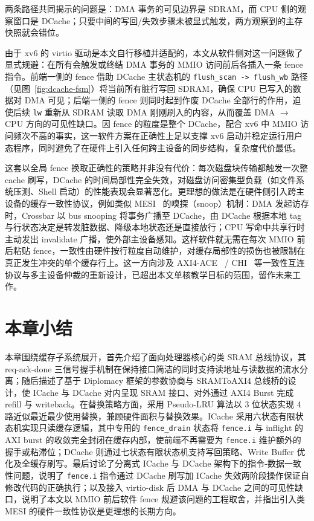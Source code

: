 两条路径共同揭示的问题是：DMA 事务的可见边界是 SDRAM，而 CPU 侧的观察窗口是 DCache；只要中间的写回/失效步骤未被显式触发，两方观察到的主存快照就会错位。

由于 xv6 的 virtio 驱动是本文自行移植并适配的，本文从软件侧对这一问题做了显式规避：在所有会触发或终结 DMA 事务的 MMIO 访问前后各插入一条 fence 指令。前端一侧的 fence 借助 DCache 主状态机的 \lstinline|flush_scan -> flush_wb| 路径（见图~\ref{fig:dcache-fsm}）将当前所有脏行写回 SDRAM，确保 CPU 已写入的数据对 DMA 可见；后端一侧的 fence 则同时起到作废 DCache 全部行的作用，迫使后续 \lstinline|lw| 重新从 SDRAM 读取 DMA 刚刚刷入的内容，从而覆盖 DMA $\to$ CPU 方向的可见性缺口。因 fence 的粒度是整个 DCache，配合 xv6 中 MMIO 访问频次不高的事实，这一软件方案在正确性上足以支撑 xv6 启动并稳定运行用户态程序，同时避免了在硬件上引入任何跨主设备的同步结构，复杂度代价最低。

这套以全局 fence 换取正确性的策略并非没有代价：每次磁盘块传输都触发一次整 cache 刷写，DCache 的时间局部性完全失效，对磁盘访问密集型负载（如文件系统压测、Shell 启动）的性能表现会显著恶化。更理想的做法是在硬件侧引入跨主设备的缓存一致性协议，例如类似 MESI~\cite{papamarcos1984mesi} 的嗅探（snoop）机制：DMA 发起访存时，Crossbar 以 bus snooping 将事务广播至 DCache，由 DCache 根据本地 tag 与行状态决定是转发脏数据、降级本地状态还是直接放行；CPU 写命中共享行时主动发出 invalidate 广播，使外部主设备感知。这样软件就无需在每次 MMIO 前后粘贴 fence，一致性由硬件按行粒度自动维护，对缓存局部性的损伤也被限制在真正发生冲突的单个缓存行上。这一方向涉及 AXI4-ACE~\cite{arm2023ace} / CHI~\cite{arm2023chi} 等一致性互连协议与多主设备仲裁的重新设计，已超出本文单核教学目标的范围，留作未来工作。

\section{本章小结}

本章围绕缓存子系统展开，首先介绍了面向处理器核心的类 SRAM 总线协议，其 req-ack-done 三信号握手机制在保持接口简洁的同时支持读地址与读数据的流水分离；随后描述了基于 Diplomacy 框架的参数协商与 SRAMToAXI4 总线桥的设计，使 ICache 与 DCache 对内呈现 SRAM 接口、对外通过 AXI4 Burst 完成 refill 与 writeback。在替换策略方面，采用 Pseudo-LRU 算法以 3 位状态实现 4 路近似最近最少使用替换，兼顾硬件面积与替换效果。ICache 采用六状态有限状态机实现只读缓存逻辑，其中专用的 \lstinline|fence_drain| 状态将 \lstinline|fence.i| 与 inflight 的 AXI burst 的收敛完全封闭在缓存内部，使前端不再需要为 \lstinline|fence.i| 维护额外的握手或粘滞位；DCache 则通过七状态有限状态机支持写回策略、Write Buffer 优化及全缓存刷写。最后讨论了分离式 ICache 与 DCache 架构下的指令-数据一致性问题，说明了 \lstinline|fence.i| 指令通过 DCache 刷写加 ICache 失效两阶段操作保证自修改代码的正确执行；以及接入 virtio-disk 后 DMA 与 DCache 之间的可见性缺口，说明了本文以 MMIO 前后软件 fence 规避该问题的工程取舍，并指出引入类 MESI 的硬件一致性协议是更理想的长期方向。
